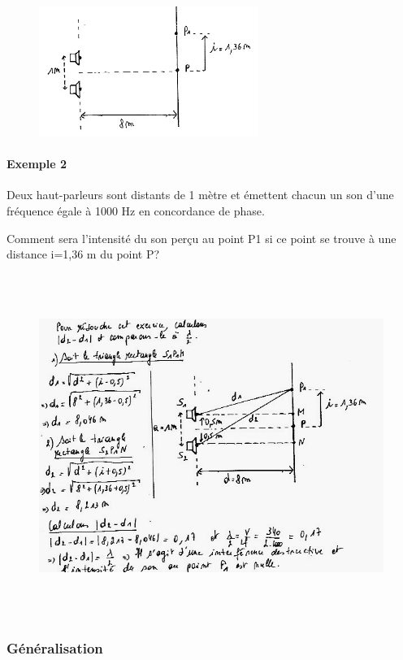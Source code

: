 \begin{figure}
\centering
\includegraphics[width=7.154cm,height=4.233cm]{Pictures/1000000100000197000000F1DA056A96FDEF75DB.png}
\caption{}
\end{figure}

\paragraph{Exemple 2}

Deux haut-parleurs sont distants de 1 mètre et émettent chacun un son
d'une fréquence égale à 1000 Hz en concordance de phase.

Comment sera l'intensité du son perçu au point P1 si ce point se trouve
à une distance i=1,36 m du point P?

\begin{figure}
\centering
\includegraphics[width=15.545cm,height=11.171cm]{Pictures/100000010000025F000001BE110A2F11D2815100.png}
\caption{}
\end{figure}

\subsubsection{Généralisation}

